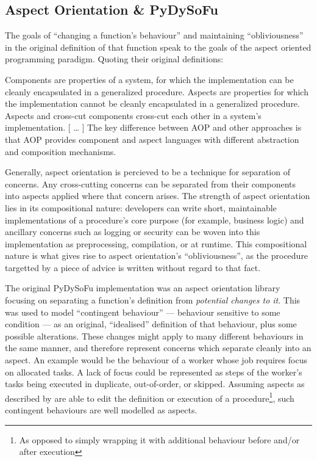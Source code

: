 \subsection{Aspect Orientation \& PyDySoFu}\label{subsec:pdsf_aop}

The goals of ``changing a function's behaviour'' and maintaining
``obliviousness'' in the original definition of that function speak to the goals
of the aspect oriented programming paradigm\cite{kiczales1997aspect}. Quoting
their original definitions:

\begin{displayquote}
    Components are properties of a system, for which the implementation can be
    cleanly encapsulated in a generalized procedure. Aspects are properties
    for which the implementation cannot be cleanly encapsulated in a
    generalized procedure. Aspects and cross-cut components cross-cut each other
    in a system’s implementation.
    [ \ldots{} ]
    The key difference between
    AOP and other approaches is that AOP provides component and aspect languages
    with different abstraction and composition mechanisms.
\end{displayquote}

Generally, aspect orientation is percieved to be a technique for separation of
concerns. Any cross-cutting concerns can be separated from their components into
aspects applied where that concern arises. The strength of aspect orientation
lies in its compositional nature: developers can write short, maintainable
implementations of a procedure's core purpose (for example, business logic) and
ancillary concerns such as logging or security can be woven into this
implementation as preprocessing, compilation, or at runtime. This compositional
nature is what gives rise to aspect orientation's ``obliviousness'', as the
procedure targetted by a piece of advice is written without regard to that fact.

The original PyDySoFu implementation was an aspect orientation library focusing
on separating a function's definition from \emph{potential changes to it}. This
was used to model ``contingent behaviour'' --- behaviour sensitive to some
condition --- as an original, ``idealised'' definition of that behaviour, plus
some possible alterations. These changes might apply to many different
behaviours in the same manner, and therefore represent concerns which separate
cleanly into an aspect. An example would be the behaviour of a worker whose job
requires focus on allocated tasks. A lack of focus could be represented as steps
of the worker's tasks being executed in duplicate, out-of-order, or skipped.
Assuming aspects as described by \citeauthor{kiczales1997aspect} are able to
edit the definition or execution of a procedure\footnote{As opposed to simply
wrapping it with additional behaviour before and/or after execution}, such
contingent behaviours are well modelled as aspects.

